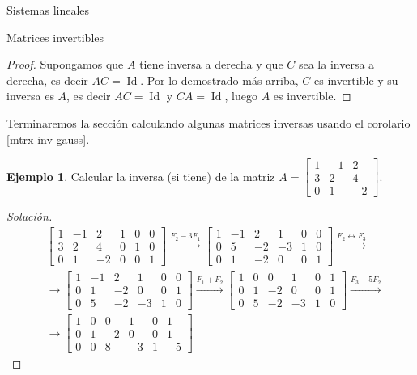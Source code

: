 \documentclass[a4paper,12pt,twoside,spanish,reqno]{amsbook}
\theoremstyle{definition}
\newtheorem{ejemplo}{Ejemplo}[section]
\theoremstyle{remark}
\newcommand{\Id}{\operatorname{Id}}
\begin{document}
\begin{chapter}{Sistemas lineales}
\begin{section}{Matrices invertibles}
\begin{proof}
				Supongamos que  $A$ tiene inversa a derecha y  que $C$ sea la inversa a derecha, es decir $AC=\Id$. Por lo demostrado más arriba, $C$ es invertible y su inversa es $A$, es decir $AC=\Id$ y $CA=\Id$, luego $A$  es invertible. 
			\end{proof}	
			
			
			
			Terminaremos la  sección calculando algunas matrices inversas usando el corolario  \ref{mtrx-inv-gauss}. 
			
			\begin{ejemplo}
				Calcular la inversa (si tiene) de la matriz $A=\begin{bmatrix}
				1&-1&2\\ 3&2&4\\ 0&1&-2
				\end{bmatrix}$. 
			\end{ejemplo}
			\begin{proof}[Solución]
				\begin{align*} 
				&\left[\begin{array}{rrr|rrr}	1&-1&2&1&0&0\\ 3&2&4&0&1&0\\ 0&1&-2&0&0&1 \end{array}\right]
				\stackrel{F_2-3 F_1}{\longrightarrow}
				\left[\begin{array}{rrr|rrr}	1&-1&2
				&1&0&0\\ 0&5&-2&-3&1&0\\ 0&1&-2&0&0&1 \end{array}\right]
				\stackrel{F_2\leftrightarrow F_3}{\longrightarrow} \\
				&\longrightarrow 
				\left[\begin{array}{rrr|rrr}	1&-1&2&1&0&0\\ 0&1&-2&0&0&1 \\ 0&5&-2&-3&1&0 \end{array}\right]
				\stackrel{F_1 + F_2}{\longrightarrow}
				\left[\begin{array}{rrr|rrr}	1&0&0&1&0&1\\ 0&1&-2&0&0&1 \\ 0&5&-2&-3&1&0 \end{array}\right]
				\stackrel{F_3-5F_2}{\longrightarrow} \\
				&\longrightarrow
				\left[\begin{array}{rrr|rrr}	1&0&0&1&0&1\\ 0&1&-2&0&0&1 \\ 0&0&8&-3&1&-5 \end{array}\right]

\end{align*}
\end{proof}
\end{section}
\end{chapter}
\end{document}
